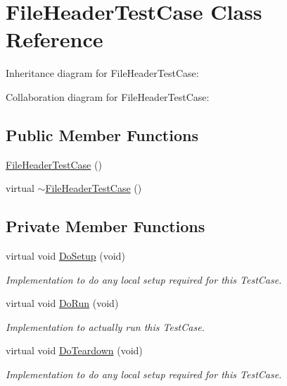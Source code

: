\hypertarget{classFileHeaderTestCase}{}\section{File\+Header\+Test\+Case Class Reference}
\label{classFileHeaderTestCase}


Inheritance diagram for File\+Header\+Test\+Case\+:


Collaboration diagram for File\+Header\+Test\+Case\+:
\subsection*{Public Member Functions}
\begin{DoxyCompactItemize}
\item 
\hyperlink{classFileHeaderTestCase_aed216bec70c09a69cdcfdf6ac910573a}{File\+Header\+Test\+Case} ()
\item 
virtual \hyperlink{classFileHeaderTestCase_ad5ffb6a790733cae10f55cbcb9b443bc}{$\sim$\+File\+Header\+Test\+Case} ()
\end{DoxyCompactItemize}
\subsection*{Private Member Functions}
\begin{DoxyCompactItemize}
\item 
virtual void \hyperlink{classFileHeaderTestCase_ac7487b9a10d955145e0ab0150aace4d2}{Do\+Setup} (void)
\begin{DoxyCompactList}\small\item\em Implementation to do any local setup required for this Test\+Case. \end{DoxyCompactList}\item 
virtual void \hyperlink{classFileHeaderTestCase_a22d10594519437accb25ffb42e89068c}{Do\+Run} (void)
\begin{DoxyCompactList}\small\item\em Implementation to actually run this Test\+Case. \end{DoxyCompactList}\item 
virtual void \hyperlink{classFileHeaderTestCase_a357f92b293e1638ee07ab2cae81700d0}{Do\+Teardown} (void)
\begin{DoxyCompactList}\small\item\em Implementation to do any local setup required for this Test\+Case. \end{DoxyCompactList}\end{DoxyCompactItemize}
